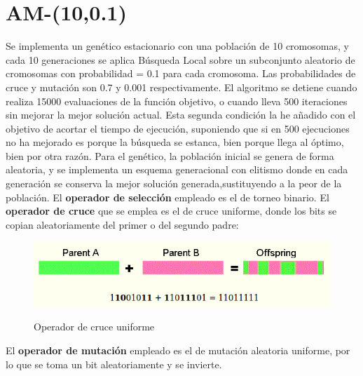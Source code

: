 \documentclass[	DIV=calc,%
							paper=a4,%
							fontsize=11pt,
							onecolumn]{scrartcl}	 					%
\begin{document}
\section*{AM-(10,0.1)}
Se implementa un genético estacionario con una población de 10 cromosomas, y cada 10 generaciones se aplica Búsqueda Local sobre un subconjunto aleatorio de cromosomas con probabilidad = 0.1 para cada cromosoma. \newline
\newline
Las probabilidades de cruce y mutación son 0.7 y 0.001 respectivamente. El algoritmo se detiene cuando realiza 15000 evaluaciones de la función objetivo, o cuando lleva 500 iteraciones sin mejorar la mejor solución actual. Esta segunda condición la he añadido con el objetivo de acortar el tiempo de ejecución, suponiendo que si en 500 ejecuciones no ha mejorado es porque la búsqueda se estanca, bien porque llega al óptimo, bien por otra razón. \newline
Para el genético, la población inicial se genera de forma aleatoria, y se implementa un esquema generacional con elitismo donde en cada generación se conserva la mejor solución generada,sustituyendo a la peor de la población. \newline
El \textbf{operador de selección} empleado es el de torneo binario. El \textbf{operador de cruce}
que se emplea es el de cruce uniforme, donde los bits se copian aleatoriamente del primer o del segundo padre:
\begin{figure}[H] %
\centering
\includegraphics[scale=0.52]{cruce.png}  %
\label{}
\caption{Operador de cruce uniforme}   
\end{figure}

El \textbf{operador de mutación} empleado es el de mutación aleatoria uniforme, por lo que se toma un bit aleatoriamente y se invierte. 
\end{document}
